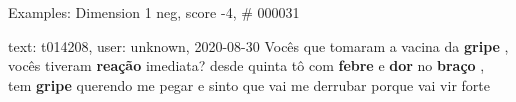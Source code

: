 \begin{frame}{Examples: Dimension 1 neg, score -4, \# 000031}
\footnotesize
\begin{alertblock}{text: t014208, user: unknown, 2020-08-30}
Vocês que tomaram a vacina da \textbf{gripe} , vocês tiveram \textbf{reação} 
imediata? desde quinta tô com \textbf{febre} e \textbf{dor} no \textbf{braço} , 
tem \textbf{gripe} querendo me pegar e sinto que vai me derrubar porque vai vir 
forte 
\end{alertblock}
\end{frame}
